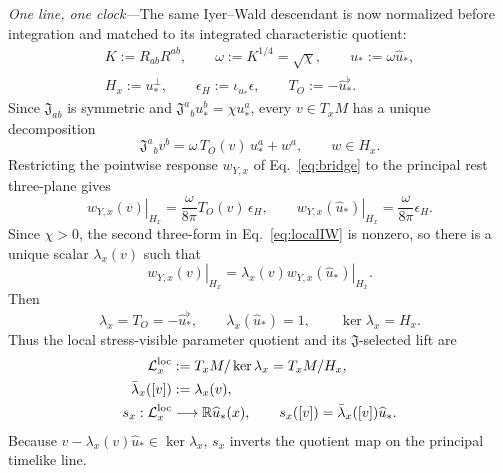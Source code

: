 \documentclass[aps,prl,reprint]{revtex4-2}
\begin{document}
\textit{One line, one clock---}The same Iyer--Wald descendant is now normalized before integration and matched to its integrated characteristic quotient:
\begin{equation}
\begin{gathered}
K:=R_{ab}R^{ab},\qquad
\omega:=K^{1/4}=\sqrt{\chi},\qquad
u_*:=\omega\widehat u_*,\\
H_x:=u_*^\perp,\qquad
\epsilon_H:=\iota_{u_*}\epsilon,\qquad
T_O:=-\widehat u_*^\flat .
\end{gathered}
\label{eq:localdata}
\end{equation}
Since $\mathfrak J_{ab}$ is symmetric and
$\mathfrak J^a{}_bu_*^b=\chi u_*^a$, every
$v\in T_xM$ has a unique decomposition
\begin{equation}
\mathfrak J^a{}_bv^b
=
\omega\,T_O(v)\,u_*^a+w^a,
\qquad
w\in H_x .
\label{eq:Jdecomposition}
\end{equation}
Restricting the pointwise response $w_{Y,x}$ of Eq.~\eqref{eq:bridge} to the principal rest three-plane gives
\begin{equation}
\left.w_{Y,x}(v)\right|_{H_x}
=
\frac{\omega}{8\pi}
T_O(v)\,\epsilon_H,
\qquad
\left.w_{Y,x}(\widehat u_*)\right|_{H_x}
=
\frac{\omega}{8\pi}\epsilon_H .
\label{eq:localIW}
\end{equation}
Since $\chi>0$, the second three-form in Eq.~\eqref{eq:localIW} is nonzero, so there is a unique scalar $\lambda_x(v)$ such that
\begin{equation}
\left.w_{Y,x}(v)\right|_{H_x}
=
\lambda_x(v)
\left.w_{Y,x}(\widehat u_*)\right|_{H_x}.
\label{eq:lambdalocaldef}
\end{equation}
Then
\begin{equation}
\lambda_x
=
T_O
=
-\widehat u_*^\flat,
\qquad
\lambda_x(\widehat u_*)=1,
\qquad
\ker\lambda_x=H_x .
\label{eq:lambdalocal}
\end{equation}
Thus the local stress-visible parameter quotient and its $\mathfrak J$-selected lift are
\begin{equation}
\begin{aligned}
\mathcal L_x^{\rm loc}
&:=T_xM/\ker\lambda_x
=T_xM/H_x,\\
\bar\lambda_x([v])
&:=\lambda_x(v),\\
s_x:\mathcal L_x^{\rm loc}
&\longrightarrow\mathbb R\widehat u_*(x),
\qquad
s_x([v])
=\bar\lambda_x([v])\widehat u_* .
\end{aligned}
\label{eq:locallift}
\end{equation}
Because $v-\lambda_x(v)\widehat u_*\in\ker\lambda_x$, $s_x$ inverts the quotient map on the principal timelike line.
\end{document}
